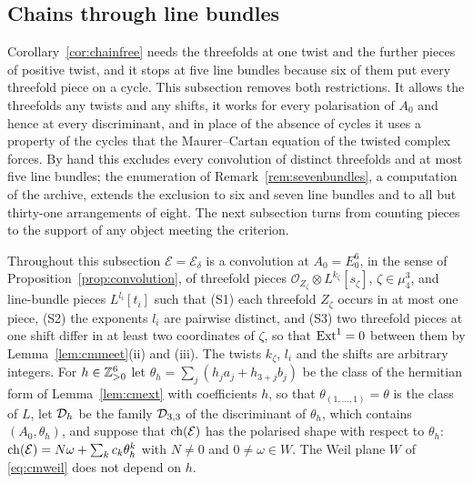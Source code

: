 \subsection{Chains through line bundles}\label{ssec:linebundles}

Corollary~\ref{cor:chainfree} needs the threefolds at one twist and the further pieces of positive twist, and it stops at five line bundles because six of them put every threefold piece on a cycle. This subsection removes both restrictions. It allows the threefolds any twists and any shifts, it works for every polarisation of $A_{0}$ and hence at every discriminant, and in place of the absence of cycles it uses a property of the cycles that the Maurer--Cartan equation of the twisted complex forces. By hand this excludes every convolution of distinct threefolds and at most five line bundles; the enumeration of Remark~\ref{rem:sevenbundles}, a computation of the archive, extends the exclusion to six and seven line bundles and to all but thirty-one arrangements of eight. The next subsection turns from counting pieces to the support of any object meeting the criterion.

\begin{setup}\label{setup:lb}
Throughout this subsection $\mathcal{E}=\mathcal{E}_{\delta}$ is a convolution at $A_{0}=E_{0}^{6}$, in the sense of Proposition~\ref{prop:convolution}, of threefold pieces $\mathcal{O}_{Z_{\zeta}}\otimes L^{k_{\zeta}}[s_{\zeta}]$, $\zeta\in\mu_{4}^{3}$, and line-bundle pieces $L^{l_{i}}[t_{i}]$ such that (S1) each threefold $Z_{\zeta}$ occurs in at most one piece, (S2) the exponents $l_{i}$ are pairwise distinct, and (S3) two threefold pieces at one shift differ in at least two coordinates of $\zeta$, so that $\mathrm{Ext}^{1}=0$ between them by Lemma~\ref{lem:cmmeet}(ii) and (iii). The twists $k_{\zeta}$, $l_{i}$ and the shifts are arbitrary integers. For $h\in\mathbb{Z}_{>0}^{6}$ let $\theta_{h}=\sum_{j}(h_{j}a_{j}+h_{3+j}b_{j})$ be the class of the hermitian form of Lemma~\ref{lem:cmext} with coefficients $h$, so that $\theta_{(1,\dots,1)}=\theta$ is the class of $L$, let $\mathcal{D}_{h}$ be the family $\mathcal{D}_{3,3}$ of the discriminant of $\theta_{h}$, which contains $(A_{0},\theta_{h})$, and suppose that $\mathrm{ch}(\mathcal{E})$ has the polarised shape with respect to $\theta_{h}$: $\mathrm{ch}(\mathcal{E})=N\omega+\sum_{k}c_{k}\theta_{h}^{k}$ with $N\ne0$ and $0\ne\omega\in W$. The Weil plane $W$ of \eqref{eq:cmweil} does not depend on $h$.
\end{setup}

